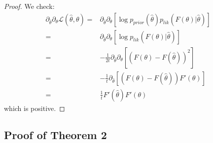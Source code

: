\begin{proof}
We check:
\begin{align*}
 \partial_{\widehat{\theta}}\partial_\theta   \mathcal{L}(\widehat{\theta},\theta) =& \partial_{\widehat{\theta}}\partial_\theta \left[\log p_{prior}(\widehat{\theta}) p_{lik}(F(\theta)|\widehat{\theta})\right] \\
 =& \partial_{\widehat{\theta}}\partial_\theta \left[ \log p_{lik}(F(\theta)|\widehat{\theta})\right] \\
 =& -\frac{1}{2t} \partial_{\widehat{\theta}}\partial_\theta \left[ (F(\theta)-F(\widehat{\theta}))^2\right] \\
 =& -\frac{1}{t} \partial_{\widehat{\theta}} \left[ (F(\theta)-F(\widehat{\theta})) F'(\theta)\right] \\
 =& \frac{1}{t}  F'(\widehat{\theta}) F'(\theta)  
\end{align*}
which is positive.




\end{proof}

\subsection{Proof of Theorem 2}
\label{sec:proof-theorem-2}

